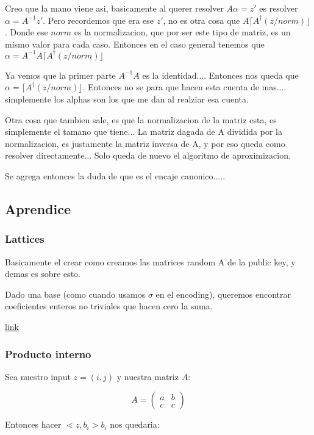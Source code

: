 \documentclass[12pt, oneside]{article}
\begin{document}
Creo que la mano viene asi, basicamente al querer resolver $A\alpha=z'$ es resolver $\alpha=A^{-1}z'$.
Pero recordemos que era ese $z'$, no es otra cosa que $A\lceil A^{\dagger}(z/norm)\rfloor$.
Donde ese $norm$ es la normalizacion, que por ser este tipo de matriz, es un mismo valor para cada caso.
Entonces en el caso general tenemos que $\alpha=A^{-1}A\lceil A^{\dagger}(z/norm)\rfloor$

Ya vemos que la primer parte $A^{-1}A$ es la identidad....
Entonces nos queda que $\alpha=\lceil A^{\dagger}(z/norm)\rfloor$.
Entonces no se para que hacen esta cuenta de mas.... simplemente los alphas son
los que me dan al realziar esa cuenta.

Otra cosa que tambien sale, es que la normalizacion de la matriz esta, es simplemente el tamano que tiene...
La matriz dagada de A dividida por la normalizacion, es justamente la matriz inversa de A, y por eso queda como
resolver directamente... Solo queda de nuevo el algoritmo de aproximizacion.

Se agrega entonces la duda de que es el encaje canonico.....



\subsection{Aprendice}
\subsubsection{Lattices}
Basicamente el crear como creamos las matrices random A de la public key, y demas
es sobre esto.

Dado una base (como cuando usamos $\sigma$ en el encoding), queremos encontrar
coeficientes enteros no triviales que hacen cero la suma.

\href{https://www.youtube.com/watch?v=FVFw_qb1ZkY}{link}
\subsubsection{Producto interno}
Sea nuestro input $z=(i, j)$ y nuestra matriz $A$:

\begin{equation*}
    A=
    \begin{pmatrix}
        a & b  \\
        c & c
    \end{pmatrix}
    \label{eq:ejA}
\end{equation*}

Entonces hacer $<z,b_i>b_i$ nos quedaria:
\end{document}
